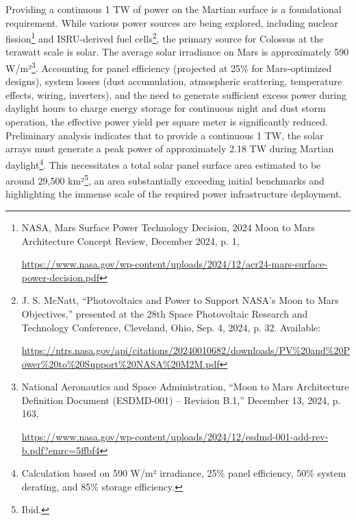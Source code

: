 \documentclass[fontsize=10pt, oneside, DIV=calc]{scrartcl}
\begin{document}
\medskip

\noindent
Providing a continuous 1 TW of power on the Martian surface is a foundational requirement. While various power sources are being explored, including nuclear fission\footnote{NASA, Mars Surface Power Technology Decision, 2024 Moon to Mars Architecture Concept Review, December 2024, p. 1,








\href{https://www.nasa.gov/wp-content/uploads/2024/12/acr24-mars-surface-power-decision.pdf}\url{https://www.nasa.gov/wp-content/uploads/2024/12/acr24-mars-surface-power-decision.pdf}} and ISRU-derived fuel cells\footnote{J. S. McNatt, ``Photovoltaics and Power to Support NASA’s Moon to Mars Objectives,'' presented at the 28th Space Photovoltaic Research and Technology Conference, Cleveland, Ohio, Sep. 4, 2024, p. 32. Available:








\href{https://ntrs.nasa.gov/api/citations/20240010682/downloads/PV\%20and\%20Power\%20to\%20Support\%20NASA\%20M2M.pdf}\url{https://ntrs.nasa.gov/api/citations/20240010682/downloads/PV\%20and\%20Power\%20to\%20Support\%20NASA\%20M2M.pdf}}, the primary source for Colossus at the terawatt scale is solar. The average solar irradiance on Mars is approximately 590 W/m²\footnote{National Aeronautics and Space Administration, ``Moon to Mars Architecture Definition Document (ESDMD-001) – Revision B.1,'' December 13, 2024, p. 163,








\href{https://www.nasa.gov/wp-content/uploads/2024/12/esdmd-001-add-rev-b.pdf?emrc=5ffbf4}\url{https://www.nasa.gov/wp-content/uploads/2024/12/esdmd-001-add-rev-b.pdf?emrc=5ffbf4}}. Accounting for panel efficiency (projected at 25\% for Mars-optimized designs), system losses (dust accumulation, atmospheric scattering, temperature effects, wiring, inverters), and the need to generate sufficient excess power during daylight hours to charge energy storage for continuous night and dust storm operation, the effective power yield per square meter is significantly reduced. Preliminary analysis indicates that to provide a continuous 1 TW, the solar arrays must generate a peak power of approximately 2.18 TW during Martian daylight\footnote{Calculation based on 590 W/m² irradiance, 25\% panel efficiency, 50\% system derating, and 85\% storage efficiency.}. This necessitates a total solar panel surface area estimated to be around 29,500 km²\footnote{Ibid.}, an area substantially exceeding initial benchmarks and highlighting the immense scale of the required power infrastructure deployment.
\end{document}
